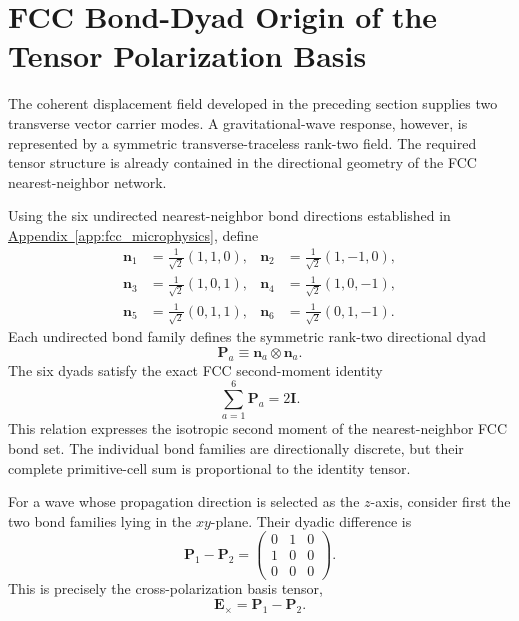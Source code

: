 \section{FCC Bond-Dyad Origin of the Tensor Polarization Basis}
\label{sec:n3_fcc_bond_dyad}

The coherent displacement field developed in the preceding section supplies two transverse vector carrier modes. A gravitational-wave response, however, is represented by a symmetric transverse-traceless rank-two field. The required tensor structure is already contained in the directional geometry of the FCC nearest-neighbor network.

Using the six undirected nearest-neighbor bond directions established in \hyperref[app:fcc_microphysics]{Appendix~\ref*{app:fcc_microphysics}}, define
\begin{align}
    \mathbf{n}_{1} &= \frac{1}{\sqrt{2}} (1,1,0), & \mathbf{n}_{2} &= \frac{1}{\sqrt{2}} (1,-1,0), \\
    \mathbf{n}_{3} &= \frac{1}{\sqrt{2}} (1,0,1), & \mathbf{n}_{4} &= \frac{1}{\sqrt{2}} (1,0,-1), \\
    \mathbf{n}_{5} &= \frac{1}{\sqrt{2}} (0,1,1), & \mathbf{n}_{6} &= \frac{1}{\sqrt{2}} (0,1,-1).
\end{align}
Each undirected bond family defines the symmetric rank-two directional dyad
\begin{equation}
    \mathbf{P}_{a} \equiv \mathbf{n}_{a} \otimes \mathbf{n}_{a}.
\end{equation}
The six dyads satisfy the exact FCC second-moment identity
\begin{equation}
    \sum_{a=1}^{6} \mathbf{P}_{a} = 2\mathbf{I}.
\end{equation}
This relation expresses the isotropic second moment of the nearest-neighbor FCC bond set. The individual bond families are directionally discrete, but their complete primitive-cell sum is proportional to the identity tensor.

For a wave whose propagation direction is selected as the $z$-axis, consider first the two bond families lying in the $xy$-plane. Their dyadic difference is
\begin{equation}
    \mathbf{P}_{1} - \mathbf{P}_{2} = 
    \begin{pmatrix}
        0 & 1 & 0 \\
        1 & 0 & 0 \\
        0 & 0 & 0
    \end{pmatrix}.
\end{equation}
This is precisely the cross-polarization basis tensor,
\begin{equation}
    \mathbf{E}_{\times} = \mathbf{P}_{1} - \mathbf{P}_{2}.
\end{equation}

